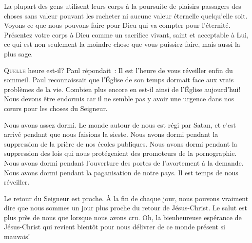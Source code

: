 La plupart des gens utilisent leurs corps à la poursuite de plaisirs passagers
 \ocadr des choses sans valeur pouvant les racheter ni aucune valeur éternelle
 quelqu'elle soit. Voyons ce que nous pouvons faire pour Dieu qui va compter
 pour l'éternité. Présentez votre corps à Dieu comme un sacrifice vivant,
 saint et acceptable à Lui, ce qui est non seulement la moindre chose
 que vous puissiez faire, mais aussi la plus sage.

\dvrule






\lettrine{Q}{uelle} heure est-il?
 Paul répondait~: 
 \og Il est l'heure de vous réveiller enfin du sommeil. \fg{}
 Paul reconnaissait que l'Église  de son temps
 dormait face aux vrais problèmes de la vie.
 Combien plus encore en est-il ainsi de l'Église  aujourd'hui!
 Nous devons être endormis car il ne semble pas y avoir une urgence
 dans nos c\oe{}urs pour les choses du Seigneur.

Nous avons assez dormi. Le monde autour de nous est régi par Satan,
 et c'est arrivé pendant que nous faisions la sieste.
 Nous avons dormi pendant la suppression de la prière
 de nos écoles publiques. Nous avons dormi pendant la suppression
 des lois qui nous protégeaient des promoteurs de la pornographie.
 Nous avons dormi pendant l'ouverture des portes de l'avortement à la demande.
 Nous avons dormi pendant la paganisation de notre pays.
 Il est temps de nous réveiller.


Le retour du Seigneur est proche.
 À la fin de chaque jour, nous pouvons vraiment dire que nous sommes
 un jour plus proche du retour de Jésus-Christ.
 Le salut est plus près de nous que lorsque nous avons cru.
 Oh, la bienheureuse espérance de Jésus-Christ qui revient bientôt
 pour nous délivrer de ce monde présent si mauvais!

